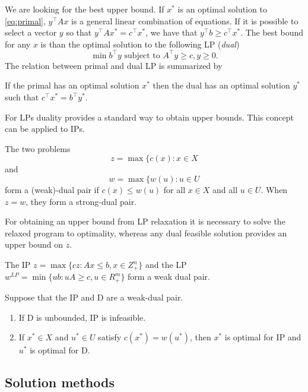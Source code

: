 We are looking for the best upper bound. 
If $x^*$ is an optimal solution to \eqref{eq:primal}, $y^\top Ax$ is a general linear combination of equations.
If it is possible to select a vector $y$ so that $y^\top Ax^*=c^\top x^*$, we have that $y^\top b \geq c^\top x^*$.
The best bound for any $x$ is than the optimal solution to the following LP (\emph{dual})
\begin{equation}
	\min b^\top y 
	\text{ subject to }
	  A^\top y \geq c,
	  y   \geq 0. 
\label{eq:dual}
\end{equation}
The relation between primal and dual LP is summarized by
\begin{proposition}
If the primal has an optimal solution $x^*$ then the dual has an optimal solution $y^*$ such that $c^\top x^* = b^\top y^*$.
\end{proposition}
For LPs duality provides a standard way to obtain upper bounds.
This concept can be applied to IPs.
\begin{definition}\cite{wolsey98}
The two problems
\begin{equation}
z=\max\{c(x): x\in X
\end{equation}
and
\begin{equation}
w=\max\{w(u): u\in U
\end{equation}
form a (weak)-dual pair if $c(x)\leq w(u)$ for all $x\in X$ and all $u\in U$. 
When $z=w$, they form a strong-dual pair.
\end{definition}
For obtaining an upper bound from LP relaxation it is necessary to solve the relaxed program to optimality, whereas any dual feasible solution provides an upper bound on $z$.
\begin{proposition}\cite{wolsey98}
The IP $z=\max\{cz: Ax\leq b, x\in Z^n_+\}$ and the LP $w^{LP}=\min\{ub:uA\geq c, u\in R^m_+\}$ form a weak dual pair.
\end{proposition}
\begin{proposition}\cite{wolsey98}
Suppose that the IP and D are a weak-dual pair.
\begin{enumerate}
\item If D is unbounded, IP is infeasible.
\item If $x^*\in X$ and $u^*\in U$ satisfy $c(x^*)=w(u^*)$, then $x^*$ is optimal for IP and $u^*$ is optimal for D.
\end{enumerate}
\end{proposition}

\subsection{Solution methods}

